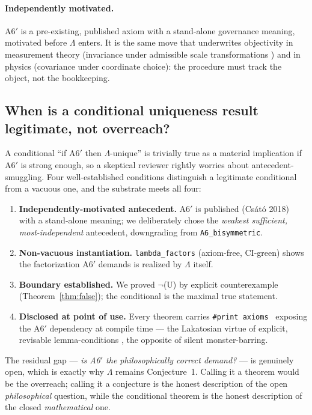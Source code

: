 \documentclass[11pt]{article}
\theoremstyle{plain}
\theoremstyle{definition}
\theoremstyle{remark}
\newcommand{\La}{\Lambda}
\newcommand{\printax}[1]{\texttt{\#print axioms}~\texttt{#1}}
\begin{document}
\paragraph{Independently motivated.} A6$'$ is a pre-existing, published axiom with a
stand-alone governance meaning, motivated before $\La$ enters. It is the same move
that underwrites objectivity in measurement theory (invariance under admissible scale
transformations \cite{foundmeas}) and in physics (covariance under coordinate choice):
the procedure must track the object, not the bookkeeping.

\subsection{When is a conditional uniqueness result legitimate, not overreach?}
A conditional ``if A6$'$ then $\La$-unique'' is trivially true as a material
implication if A6$'$ is strong enough, so a skeptical reviewer rightly worries about
antecedent-smuggling. Four well-established conditions distinguish a legitimate
conditional from a vacuous one, and the substrate meets all four:
\begin{enumerate}[leftmargin=2em,itemsep=2pt]
  \item \textbf{Independently-motivated antecedent.} A6$'$ is published (Cs\'at\'o 2018)
    with a stand-alone meaning; we deliberately chose the \emph{weakest sufficient,
    most-independent} antecedent, downgrading from \texttt{A6\_bisymmetric}.
  \item \textbf{Non-vacuous instantiation.} \texttt{lambda\_factors} (axiom-free,
    CI-green) shows the factorization A6$'$ demands is realized by $\La$ itself.
  \item \textbf{Boundary established.} We proved $\lnot$(U) by explicit counterexample
    (Theorem~\ref{thm:false}); the conditional is the maximal true statement.
  \item \textbf{Disclosed at point of use.} Every theorem carries \printax{} exposing
    the A6$'$ dependency at compile time --- the Lakatosian virtue of explicit,
    revisable lemma-conditions \cite{lakatos}, the opposite of silent monster-barring.
\end{enumerate}
The residual gap --- \emph{is A6$'$ the philosophically correct demand?} --- is
genuinely open, which is exactly why $\La$ remains Conjecture~1. Calling it a theorem
would be the overreach; calling it a conjecture is the honest description of the open
\emph{philosophical} question, while the conditional theorem is the honest
description of the closed \emph{mathematical} one.
\end{document}
